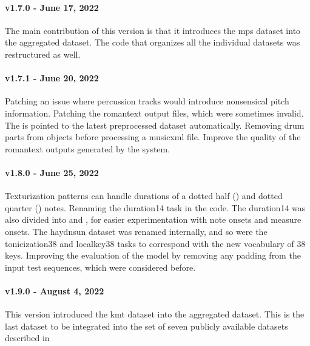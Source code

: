 \paragraph{v1.7.0 - June 17, 2022}
The main contribution of this version is that it introduces
the \gls{mps} dataset into the aggregated dataset. The code
that organizes all the individual datasets was restructured
as well.

\paragraph{v1.7.1 - June 20, 2022}
Patching an issue where percussion tracks would introduce
nonsensical pitch information. Patching the \gls{romantext}
output files, which were sometimes invalid. The
 is pointed to the latest preprocessed dataset
automatically. Removing drum parts from
 objects before processing a
\gls{musicxml} file. Improve the quality of the
\gls{romantext} outputs generated by the system.

\paragraph{v1.8.0 - June 25, 2022}
Texturization patterns can handle durations of a dotted half
(\musHalfDotted) and dotted quarter (\musQuarterDotted)
notes. Renaming the \gls{duration14} task in the code. The
\gls{duration14} was also divided into 
and , for easier experimentation with note
onsets and measure onsets. The \gls{haydnsun} dataset was
renamed internally, and so were the \gls{tonicization38} and
\gls{localkey38} tasks to correspond with the new vocabulary
of 38 keys. Improving the evaluation of the model by
removing any padding from the input test sequences, which
were considered before.

\paragraph{v1.9.0 - August 4, 2022}
This version introduced the \gls{kmt} dataset into the
aggregated dataset. This is the last dataset to be
integrated into the set of seven publicly available datasets
described in
